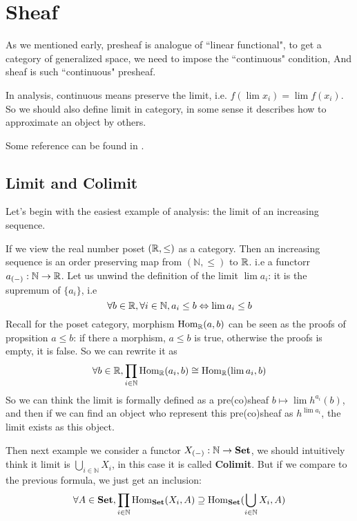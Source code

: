 \chapter{Sheaf}\label{chap:Sheaf} %

As we mentioned early, presheaf is analogue of ``linear functional", to get a category of generalized space, we need to impose the ``continuous" condition, And sheaf is such ``continuous" presheaf. 

In analysis, continuous means preserve the limit, i.e. $f(\lim x_i)=\lim f(x_i)$. So we should also define limit in category, in some sense it describes how to approximate an object by others.

Some reference can be found in \cite{maclane2012sheaves}. 
\section{Limit and Colimit}

Let's begin with the easiest example of analysis: the limit of an increasing sequence.

If we view the real number poset $(\mathbb{R}, \leq)$ as a category. Then an increasing sequence is an order preserving map from $(\mathbb{N},\leq)$ to $\mathbb{R}$. i.e a functorr
$a_{(-)}:\mathbb{N} \to \mathbb{R}$. Let us unwind the definition of the limit $ \lim a_i$: it is the supremum of $\{a_i\}$, i.e
\[
 \forall b\in \mathbb{R}, \forall i \in \mathbb{N}, a_i \leq b \Leftrightarrow \lim a_i \leq b
\]
Recall for the poset category, morphism $ \mathrm{Hom}_{\mathbb{R}}(a,b)$ can be seen as the proofs of propsition $a\leq b$: if there a morphism, $a \leq b$ is true, otherwise the proofs is empty, it is false. So we can rewrite it as
\[
  \forall b\in \mathbb{R}, \prod_{ i \in \mathbb{N}} \mathrm{Hom}_{\mathbb{R}}(a_i , b) \cong \mathrm{Hom}_{\mathbb{R}}(\lim a_i, b)
\]
So we can think the limit is formally defined as a pre(co)sheaf $b \mapsto \lim h^{a_i}(b)$, and then if we can find an object who represent this pre(co)sheaf as $h^{\lim a_i}$, the limit exists as this object.

Then next example we consider a functor $X_{(-)}: \mathbb{N} \to \mathbf{Set}$, we should intuitively think it limit is $\bigcup_{i\in \mathbb{N}} X_i$, in this case it is called \textbf{Colimit}. But if we compare to the previous formula, we just get an inclusion:
\[
  \forall A\in \mathbf{Set}, \prod_{ i \in \mathbb{N}} \mathrm{Hom}_{\mathbf{Set}}(X_i , A) \supseteq \mathrm{Hom}_{\mathbf{Set}}(\bigcup_{i\in \mathbb{N}} X_i, A)
\]


